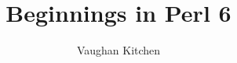 \documentclass{book}
\begin{document}
\title{Beginnings in Perl 6}
\author{Vaughan Kitchen}
\maketitle

\mainmatter





\end{document}
